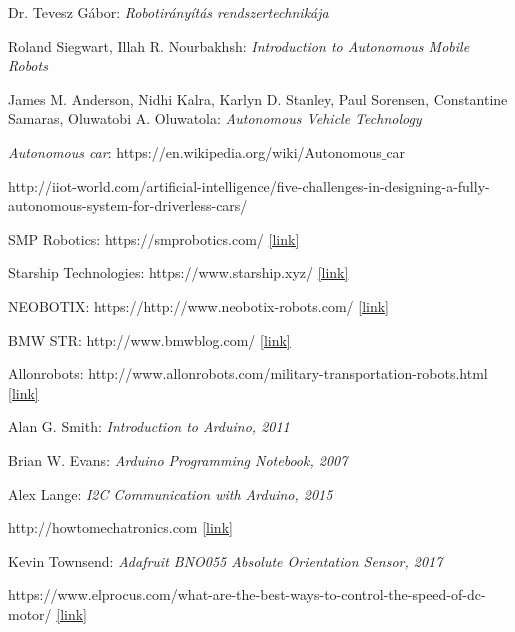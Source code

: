 \documentclass[12pt,english]{article}
\begin{document}
\newpage
\newpage
\begin{thebibliography}{1}


Dr. Tevesz Gábor:
\emph{Robotirányítás rendszertechnikája}

Roland Siegwart, Illah R. Nourbakhsh:
\emph{Introduction to Autonomous Mobile Robots}

James M. Anderson, Nidhi Kalra, Karlyn D. Stanley, Paul Sorensen, Constantine Samaras, Oluwatobi A. Oluwatola: \emph{Autonomous Vehicle Technology}

\emph{Autonomous car}: https://en.wikipedia.org/wiki/Autonomous$\_$car 

http://iiot-world.com/artificial-intelligence/five-challenges-in-designing-a-fully-autonomous-system-for-driverless-cars/

SMP Robotics: https://smprobotics.com/ \href{https://smprobotics.com/application_autonomus_mobile_robots/transport-robots/}{[link]}

Starship Technologies: https://www.starship.xyz/ \href{https://www.starship.xyz/}{[link]}

NEOBOTIX: https://http://www.neobotix-robots.com/ \href{http://www.neobotix-robots.com/}{[link]}

BMW STR: http://www.bmwblog.com/ \href{http://www.bmwblog.com/2016/11/18/bmw-logistics-now-use-autonomous-transport-robots/}{[link]}

 Allonrobots: http://www.allonrobots.com/military-transportation-robots.html \href{http://www.allonrobots.com/military-transportation-robots.html}{[link]}

 Alan G. Smith: \emph{Introduction to Arduino, 2011}

 Brian W. Evans: \emph{Arduino Programming Notebook, 2007}

 Alex Lange: \emph{I2C Communication with Arduino, 2015}

 http://howtomechatronics.com \href{http://howtomechatronics.com/}{[link]}

 Kevin Townsend: \emph{Adafruit BNO055 Absolute Orientation Sensor, 2017}
	
  https://www.elprocus.com/what-are-the-best-ways-to-control-the-speed-of-dc-motor/ \href{ https://www.elprocus.com/what-are-the-best-ways-to-control-the-speed-of-dc-motor/}{[link]}


\end{thebibliography}
\end{document}

